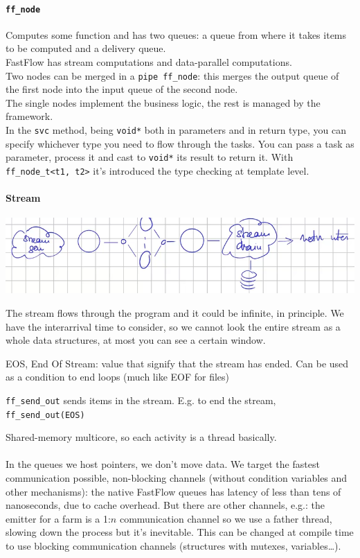 \documentclass[10pt]{report}
\begin{document}
\paragraph{\texttt{ff\_node}} Computes some function and has two queues: a queue from where it takes items to be computed and a delivery queue.\\
FastFlow has stream computations and data-parallel computations.\\
Two nodes can be merged in a \texttt{pipe ff\_node}: this merges the output queue of the first node into the input queue of the second node.\\
The single nodes implement the business logic, the rest is managed by the framework.\\
In the \texttt{svc} method, being \texttt{void*} both in parameters and in return type, you can specify whichever type you need to flow through the tasks. You can pass a task as parameter, process it and cast to \texttt{void*} its result to return it. With \texttt{ff\_node\_t<t1, t2>} it's introduced the type checking at template level.
\paragraph{Stream} \begin{center}
	\includegraphics[scale=0.5]{17.png}
\end{center}
The stream flows through the program and it could be infinite, in principle. We have the interarrival time to consider, so we cannot look the entire stream as a whole data structures, at most you can see a certain window.
\begin{list}{}{}
	\item EOS, End Of Stream: value that signify that the stream has ended. Can be used as a condition to end loops (much like EOF for files)
	\item \texttt{ff\_send\_out} sends items in the stream. E.g. to end the stream, \texttt{ff\_send\_out(EOS)}
\end{list}
Shared-memory multicore, so each activity is a thread basically.\\\\
In the queues we host pointers, we don't move data. We target the fastest communication possible, non-blocking channels (without condition variables and other mechanisms): the native FastFlow queues has latency of less than tens of nanoseconds, due to cache overhead. But there are other channels, e.g.: the emitter for a farm is a 1:$n$ communication channel so we use a father thread, slowing down the process but it's inevitable. This can be changed at compile time to use blocking communication channels (structures with mutexes, variables\ldots).
\end{document}
